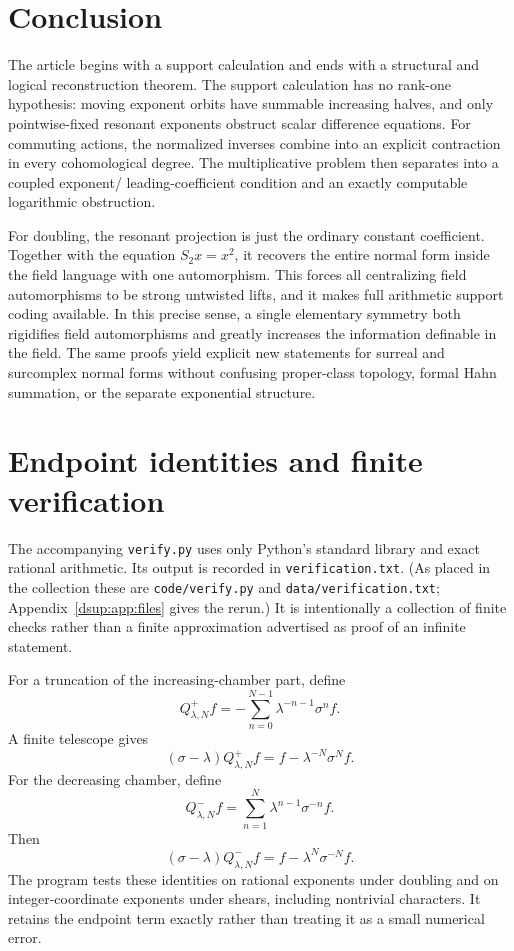 \documentclass[11pt,oneside]{article}
\numberwithin{equation}{section}
\theoremstyle{definition}
\theoremstyle{remark}
\newcommand{\repo}[1]{\nolinkurl{#1}}%
\begin{document}
\section{Conclusion}

The article begins with a support calculation and ends with a structural
and logical reconstruction theorem. The support calculation has no
rank-one hypothesis: moving exponent orbits have summable increasing
halves, and only pointwise-fixed resonant exponents obstruct scalar
difference equations. For commuting actions, the normalized inverses
combine into an explicit contraction in every cohomological degree.
The multiplicative problem then separates into a coupled exponent/
leading-coefficient condition and an exactly computable logarithmic
obstruction.

For doubling, the resonant projection is just the ordinary constant
coefficient. Together with the equation $S_2x=x^2$, it recovers the entire
normal form inside the field language with one automorphism. This forces
all centralizing field automorphisms to be strong untwisted lifts, and
it makes full arithmetic support coding available. In this precise
sense, a single elementary symmetry both rigidifies field automorphisms
and greatly increases the information definable in the field. The same
proofs yield explicit new statements for surreal and surcomplex normal
forms without confusing proper-class topology, formal Hahn summation,
or the separate exponential structure.

\appendix
\section{Endpoint identities and finite verification}\label{dsup:app:verification}

The accompanying \texttt{verify.py} uses only Python's standard library
and exact rational arithmetic. Its output is recorded in
\texttt{verification.txt}. (As placed in the collection these are
\repo{code/verify.py} and \repo{data/verification.txt};
Appendix~\ref{dsup:app:files} gives the rerun.) It is intentionally a collection of finite
checks rather than a finite approximation advertised as proof of an
infinite statement.

For a truncation of the increasing-chamber part, define
\[
 Q^+_{\lambda,N}f=-\sum_{n=0}^{N-1}
                \lambda^{-n-1}\sigma^nf.
\]
A finite telescope gives
\begin{equation}\label{dsup:eq:finiteplus}
 (\sigma-\lambda)Q^+_{\lambda,N}f
   =f-\lambda^{-N}\sigma^Nf.
\end{equation}
For the decreasing chamber, define
\[
 Q^-_{\lambda,N}f=\sum_{n=1}^{N}
                  \lambda^{n-1}\sigma^{-n}f.
\]
Then
\begin{equation}\label{dsup:eq:finiteminus}
 (\sigma-\lambda)Q^-_{\lambda,N}f
   =f-\lambda^N\sigma^{-N}f.
\end{equation}
The program tests these identities on rational exponents under doubling
and on integer-coordinate exponents under shears, including nontrivial
characters. It retains the endpoint term exactly rather than treating it
as a small numerical error.
\end{document}
